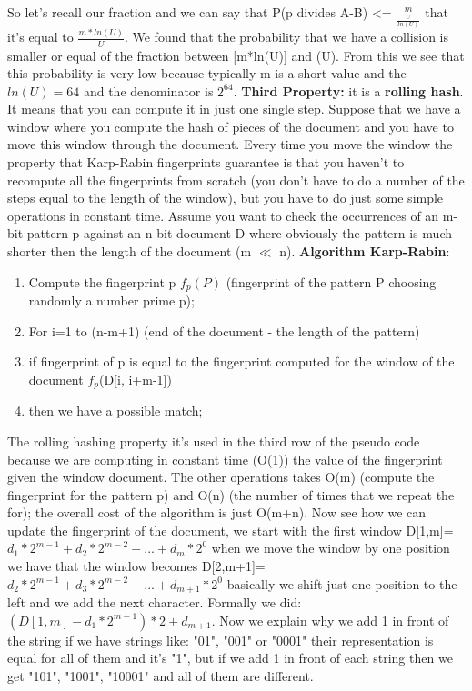 So let's recall our fraction and we can say that P(p divides A-B) <= $\frac{m}{\frac{U}{ln(U)}}$ that it's equal to $\frac{m*ln(U)}{U}$.\newline
We found that the probability that we have a collision is smaller or equal of the fraction between [m*ln(U)] and (U). From this we see that this probability is very low because typically m is a short value and the $ln(U)=64$ and the denominator is $2^{64}$.\newline
\textbf{Third Property:} it is a \textbf{rolling hash}. It means that you can compute it in just one single step. Suppose that we have a window where you compute the hash of pieces of the document and you have to move this window through the document. Every time you move the window the property that Karp-Rabin fingerprints guarantee is that you haven't to recompute all the fingerprints from scratch (you don't have to do a number of the steps equal to the length of the window), but you have to do just some simple operations in constant time.\newline
Assume you want to check the occurrences of an m-bit pattern p against an n-bit document D where obviously the pattern is much shorter then the length of the document (m $\ll$ n).\newline
\textbf{Algorithm Karp-Rabin}: 
\begin{enumerate}
    \item Compute the fingerprint p $f_p(P)$ (fingerprint of the pattern P choosing randomly a number prime p);
    \item For i=1 to (n-m+1) (end of the document - the length of the pattern)
    \item if fingerprint of p is equal to the fingerprint computed for the window of the document $f_p$(D[i, i+m-1])
    \item then we have a possible match;
\end{enumerate}
The rolling hashing property it's used in the third row of the pseudo code because we are computing in constant time (O(1)) the value of the fingerprint given the window document. The other operations takes O(m) (compute the fingerprint for the pattern p) and O(n) (the number of times that we repeat the for); the overall cost of the algorithm is just O(m+n).\newline
Now see how we can update the fingerprint of the document, we start with the first window D[1,m]=$d_1*2^{m-1}+d_2*2^{m-2}+...+d_m*2^0$ when we move the window by one position we have that the window becomes D[2,m+1]=$d_2*2^{m-1}+d_3*2^{m-2}+...+d_{m+1}*2^0$ basically we shift just one position to the left and we add the next character.\newline
Formally we did: $(D[1,m]-d_1*2^{m-1})*2+d_{m+1}$.\newline
Now we explain why we add 1 in front of the string if we have strings like: "01", "001" or "0001" their representation is equal for all of them and it's "1", but if we add 1 in front of each string then we get "101", "1001", "10001" and all of them are different.\newline
